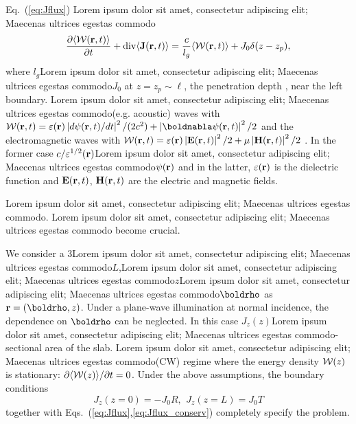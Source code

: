 Eq.~(\ref{eq:Jflux}) Lorem ipsum dolor sit amet, consectetur adipiscing elit; Maecenas ultrices egestas commodo
\begin{equation}
\frac{\partial \langle {\cal W}({\bf r},t)\rangle }{\partial t}+{\rm div}\langle{\bf J}({\bf r},t)\rangle=
\frac{c}{l_g}\langle {\cal W}({\bf r},t)\rangle+J_0 \delta(z-z_p),
\label{eq:Jflux_conserv}
\end{equation}
where $l_g$Lorem ipsum dolor sit amet, consectetur adipiscing elit; Maecenas ultrices egestas commodo$J_0$ at $z=z_p\sim\ell$, the penetration depth \cite{1993_Lisyansky_diffusint}, near the left boundary. Lorem ipsum dolor sit amet, consectetur adipiscing elit; Maecenas ultrices egestas commodo(e.g. acoustic) waves with ${\cal W}({\bf r},t)=\varepsilon({\bf r})\left|d\psi({\bf r},t)/dt\right|^2/(2c^2)+\left|\boldnabla \psi({\bf r},t)\right|^2/2$ and the electromagnetic waves with ${\cal W}({\bf r},t)=\varepsilon({\bf r})\left|{\bf E}({\bf r},t)\right|^2/2+\mu\left|{\bf H}({\bf r},t)\right|^2/2$ \cite{1953_Morse}. In the former case $c/\varepsilon^{1/2}({\bf r})$Lorem ipsum dolor sit amet, consectetur adipiscing elit; Maecenas ultrices egestas commodo$\psi({\bf r})$ and in the latter, $\varepsilon({\bf r})$ is the dielectric function and ${\bf E}({\bf r},t)$, ${\bf H}({\bf r},t)$ are the electric and magnetic fields. 

Lorem ipsum dolor sit amet, consectetur adipiscing elit; Maecenas ultrices egestas commodo. Lorem ipsum dolor sit amet, consectetur adipiscing elit; Maecenas ultrices egestas commodo\cite{2005_Cao,2009_Deych_random_laser_theory,2008_Stone,2008_Conti_opals,2009_Frank} become crucial.

We consider a 3Lorem ipsum dolor sit amet, consectetur adipiscing elit; Maecenas ultrices egestas commodo$L$,Lorem ipsum dolor sit amet, consectetur adipiscing elit; Maecenas ultrices egestas commodo$z$Lorem ipsum dolor sit amet, consectetur adipiscing elit; Maecenas ultrices egestas commodo${\boldrho}$ as ${\bf r}=({\boldrho},z)$. Under a plane-wave illumination at normal incidence, the dependence on ${\boldrho}$ can be neglected. In this case $J_z(z)$Lorem ipsum dolor sit amet, consectetur adipiscing elit; Maecenas ultrices egestas commodo-sectional area of the slab. Lorem ipsum dolor sit amet, consectetur adipiscing elit; Maecenas ultrices egestas commodo(CW) regime where the energy density ${\cal W}(z)$ is stationary: $\partial \langle {\cal W}(z)\rangle/\partial t=0$. Under the above assumptions, the boundary conditions 
\begin{equation}
J_z(z=0)=-J_0R,\ \, J_z(z=L)=J_0T
\label{eq:Jflux_bc}
\end{equation}
together with Eqs.~(\ref{eq:Jflux},\ref{eq:Jflux_conserv}) completely specify the problem.

